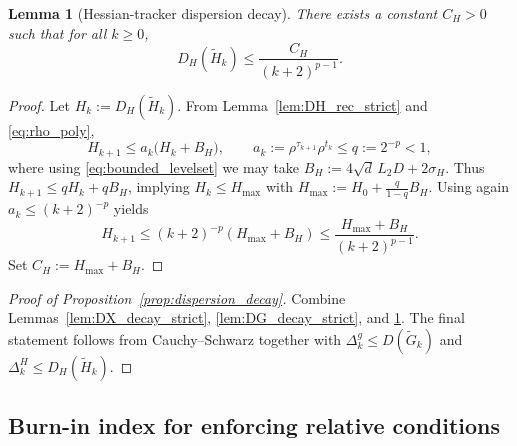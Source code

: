 \documentclass[11pt,a4paper]{article}
\newtheorem{lemma}[theorem]{Lemma}
\begin{document}
	\begin{lemma}[Hessian-tracker dispersion decay]\label{lem:DH_decay_strict}
		There exists a constant $C_H>0$ such that for all $k\ge 0$,
		\begin{equation}\label{eq:DH_decay_strict}
			D_H(\tilde H_k)\le \frac{C_H}{(k+2)^{p-1}}.
		\end{equation}
	\end{lemma}
\begin{proof}
	Let $H_k:=D_H(\tilde H_k)$. From Lemma~\ref{lem:DH_rec_strict} and \eqref{eq:rho_poly},
	\[
	H_{k+1}\le a_k\big(H_k+B_H\big),\qquad a_k:=\rho^{\tau_{k+1}}\rho^{t_k}\le q:=2^{-p}<1,
	\]
	where using \eqref{eq:bounded_levelset} we may take $B_H:=4\sqrt d\,L_2D+2\sigma_H$.
	Thus $H_{k+1}\le qH_k+qB_H$, implying $H_k\le H_{\max}$ with
	$H_{\max}:=H_0+\frac{q}{1-q}B_H$.
	Using again $a_k\le (k+2)^{-p}$ yields
	\[
	H_{k+1}\le (k+2)^{-p}(H_{\max}+B_H)\le \frac{H_{\max}+B_H}{(k+2)^{p-1}}.
	\]
	Set $C_H:=H_{\max}+B_H$.
\end{proof}
	\begin{proof}[Proof of Proposition~\ref{prop:dispersion_decay}]
		Combine Lemmas~\ref{lem:DX_decay_strict}, \ref{lem:DG_decay_strict}, and \ref{lem:DH_decay_strict}.
		The final statement follows from Cauchy--Schwarz together with $\Delta_k^g\le D(\tilde G_k)$ and $\Delta_k^H\le D_H(\tilde H_k)$.
	\end{proof}
	
	\subsection{Burn-in index for enforcing relative conditions}
	
\end{document}
